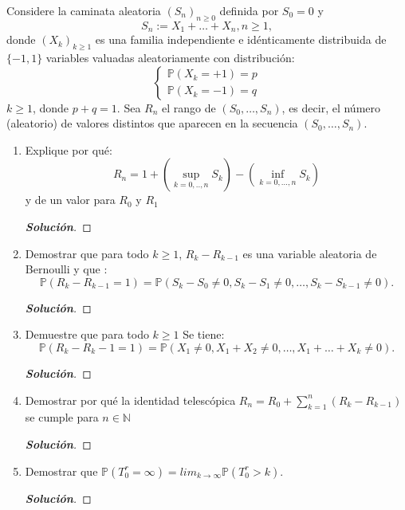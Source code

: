 \documentclass[12pt, letterpaper]{article}
\newcommand{\p}{\mathbb{P}}
\newenvironment{manualtheorem}[1]{%
  \renewcommand\themanualtheoreminner{#1}%
  \manualtheoreminner
}{\endmanualtheoreminner}
\newenvironment{solucion}
  {\renewcommand\qedsymbol{$\square$}\begin{proof}[\textbf{Solución}]}
  {\end{proof}}
\begin{document}
    \begin{manualtheorem}{4.2}
    Considere la caminata aleatoria $(S_n)_{n \geq 0}$ definida por $S_0 = 0$ y $$S_n:=X_1+\dots+X_n, n\geq 1,$$
    donde $(X_k)_{k \geq 1}$ es una familia independiente e idénticamente distribuida de $\{-1,1\}$ variables valuadas aleatoriamente con distribución:
    $$\left\{\begin{matrix}
    \p(X_k=+1)=p\\ 
    \p(X_k=-1)=q
    \end{matrix}\right.$$
    $k \geq 1$, donde $p + q = 1$. Sea $R_n$ el rango de $(S_0, \dots, S_n)$,
    es decir, el número (aleatorio) de valores distintos que aparecen en la secuencia
    $(S_0, \dots, S_n)$.
    \renewcommand{\labelenumi}{(\alph{enumi})}
    \begin{enumerate}
        \item Explique por qué:
        $$R_n=1+\left( \sup_{k=0,..,n}S_k \right) -\left( \inf_{k=0,\dots,n}S_k \right)$$
        y de un valor para $R_0$ y $R_1$
        \begin{solucion}
        \end{solucion}
        
        \item Demostrar que para todo  $k \geq 1$, $R_k - R_{k-1}$ es una variable aleatoria de Bernoulli y que :
        $$\p(R_k-R_{k-1}=1)=\p(S_k-S_0 \neq 0 , S_k-S_1\neq 0, \dots, S_k-S_{k-1}\neq 0).$$
        \begin{solucion}
        \end{solucion}
        
        \item Demuestre que para todo $k \geq 1 $ Se tiene:
        $$\p(R_k-R_k-1=1)=\p(X_1\neq0,X_1+X_2\neq0,\dots,X_1+\dots+X_k\neq 0).$$
        \begin{solucion}
        \end{solucion}
        
        \item Demostrar por qué la identidad telescópica $R_n=R_0+\sum^{n}_{k=1}(R_k-R_{k-1})$ se cumple para $n \in \mathbb{N}$
        \begin{solucion}
        \end{solucion}
        
        \item Demostrar que  $\p(T^{r}_0=\infty)={lim}_{k\rightarrow \infty}\p(T^{r}_{0}>k)$.
        \begin{solucion}
        \end{solucion}
        

\end{enumerate}
\end{manualtheorem}
\end{document}
